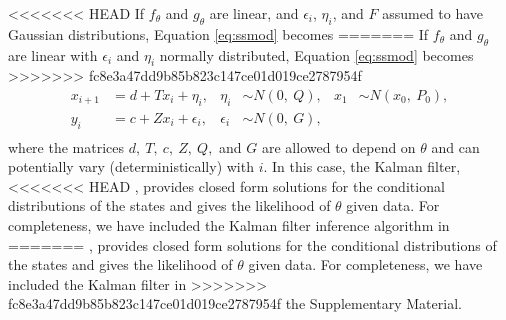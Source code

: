 \documentclass[aoas]{imsart}
\DeclareRobustCommand{\varx}{{\mathpalette\irchi\relax}}
\newcommand{\irchi}[2]{\protect\raisebox{\depth}{$#1\upchi$}}
\begin{document}
<<<<<<< HEAD
If $f_\theta$ and $g_\theta$ are linear, and $\epsilon_i$,
$\eta_i$, and $F$ assumed to have Gaussian distributions, Equation \eqref{eq:ssmod} becomes
=======
If $f_\theta$ and $g_\theta$ are linear with $\epsilon_i$ and
$\eta_i$ normally distributed, Equation \eqref{eq:ssmod} becomes
>>>>>>> fc8e3a47dd9b85b823c147ce01d019ce2787954f
\begin{equation}
  \begin{aligned}
    x_{i+1}&= d+T x_i + \eta_{i}, 
    & \eta_i &\sim N(0,\ Q),     
    &x_1 &\sim N(x_0,\ P_0),\\
    y_i&= c + Z x_i + \epsilon_i,     
    & \epsilon_i &\sim N(0,\ G), \\
  \end{aligned}
  \label{eq:lgmod}
\end{equation}
where the matrices $d,\ T,\ c,\ Z,\ Q,$ and $G$ are allowed to depend
on $\theta$ and can potentially vary (deterministically) with $i$. In this case,
the Kalman filter, %
<<<<<<< HEAD
\citep[see for example,][]{Kalman1960,Harvey1990},
provides closed form 
solutions for the conditional
distributions of the states and gives the likelihood of $\theta$
given data. For completeness, we have included the Kalman filter
inference algorithm in
=======
\citep[see e.g.,][]{Kalman1960,Harvey1990},
provides closed form 
solutions for the conditional
distributions of the states and gives the likelihood of $\theta$
given data. For completeness, we have included the Kalman filter in
>>>>>>> fc8e3a47dd9b85b823c147ce01d019ce2787954f
the Supplementary Material.%
\end{document}
